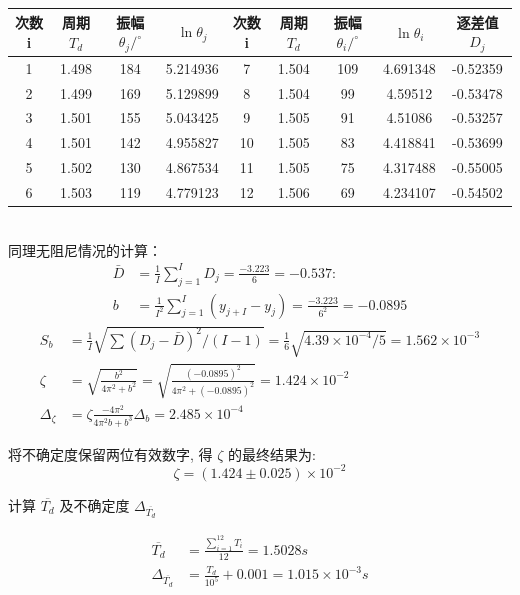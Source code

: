 \documentclass[UTF8]{ctexart}
\begin{document}
\begin{tabular}{|c|c|c|c|c|c|c|c|c|}
    \hline   次数  i &  周期$T_d$&振幅  $\theta_{j} /^{\circ}$ & $\ln \theta_{j} $&  次数  i &周期$T_d$&  振幅  $\theta_{i} /^{\circ}$ & $\ln \theta_{i}$& 逐差值$D_j$ \\
    \hline 1 & 1.498 & 184 & 5.214936 & 7 & 1.504 & 109 & 4.691348 & -0.52359 \\
    \hline 2 & 1.499 & 169 & 5.129899 & 8 & 1.504 & 99 & 4.59512 & -0.53478 \\
    \hline 3 & 1.501 & 155 & 5.043425 & 9 & 1.505 & 91 & 4.51086 & -0.53257 \\
    \hline 4 & 1.501 & 142 & 4.955827 & 10 & 1.505 & 83 & 4.418841 & -0.53699 \\
    \hline 5 & 1.502 & 130 & 4.867534 & 11 & 1.505 & 75 & 4.317488 & -0.55005 \\
    \hline 6 & 1.503 & 119 & 4.779123 & 12 & 1.506 & 69 & 4.234107 & -0.54502 \\
    \hline
\end{tabular}\\

同理无阻尼情况的计算：
\begin{align}
    \bar{D}&=\frac{1}{I} \sum_{j=1}^{I} D_{j}=\frac{-3.223}{6}=-0.537:  \nonumber  \\
    b&=\frac{1}{I^{2}} \sum_{j=1}^{I}\left(y_{j+I}-y_{j}\right)=\frac{-3.223}{6^{2}}=-0.0895 \nonumber 
\end{align}
\begin{align}
    S_{b}&=\frac{1}{I} \sqrt{\sum\left(D_{j}-\bar{D}\right)^{2} /(I-1)}=\frac{1}{6} \sqrt{4.39 \times 10^{-4} /5}=1.562 \times 10^{-3} \nonumber \\
    \zeta&=\sqrt{\frac{b^{2}}{4 \pi^{2}+b^{2}}}=\sqrt{\frac{{(-0.0895)}^{2}}{4 \pi^{2}+{(-0.0895)}^{2}}}=1.424 \times 10^{-2}\nonumber\\
    \Delta_{\zeta}&=\zeta \frac{-4 \pi^{2}}{4 \pi^{2} b+b^{3}} \Delta_{b}=2.485 \times 10^{-4}\nonumber
\end{align}

将不确定度保留两位有效数字, 得  $\zeta $ 的最终结果为:
    $$
    \zeta=(1.424 \pm 0.025) \times 10^{-2}
    $$

计算 $ \overline{T_{d}} $ 及不确定度 $ \Delta_{\overline{T_{d}}} $

\begin{align}
\overline{T_{d}}&=\frac{\sum_{i=1}^{12} T_{i}}{12}=1.5028 s \nonumber\\
\Delta_{\overline{T_{d}}}&=\frac{T_{d}}{10^{5}}+0.001=1.015 \times 10^{-3} s\nonumber
\end{align}
\end{document}
